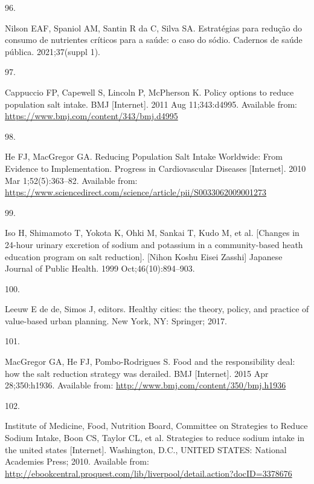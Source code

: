 \documentclass[
]{article}
\newlength{\cslhangindent}
\newlength{\csllabelwidth}
\newlength{\cslentryspacingunit} %
\newenvironment{CSLReferences}[2] %
 {%
  \setlength{\parindent}{0pt}
  \ifodd #1
  \let\oldpar\par
  \def\par{\hangindent=\cslhangindent\oldpar}
  \fi
  \setlength{\parskip}{#2\cslentryspacingunit}
 }%
 {}
\newcommand{\CSLLeftMargin}[1]{\parbox[t]{\csllabelwidth}{#1}}
\newcommand{\CSLRightInline}[1]{\parbox[t]{\linewidth - \csllabelwidth}{#1}\break}
\begin{document}
\begin{CSLReferences}{0}{0}
\leavevmode{}%
\CSLLeftMargin{96. }%
\CSLRightInline{Nilson EAF, Spaniol AM, Santin R da C, Silva SA.
Estratégias para redução do consumo de nutrientes críticos para a saúde:
o caso do sódio. Cadernos de saúde pública. 2021;37(suppl 1). }

\leavevmode{}%
\CSLLeftMargin{97. }%
\CSLRightInline{Cappuccio FP, Capewell S, Lincoln P, McPherson K. Policy
options to reduce population salt intake. BMJ {[}Internet{]}. 2011 Aug
11;343:d4995. Available from:
\url{https://www.bmj.com/content/343/bmj.d4995}}

\leavevmode{}%
\CSLLeftMargin{98. }%
\CSLRightInline{He FJ, MacGregor GA. Reducing Population Salt Intake
Worldwide: From Evidence to Implementation. Progress in Cardiovascular
Diseases {[}Internet{]}. 2010 Mar 1;52(5):363--82. Available from:
\url{https://www.sciencedirect.com/science/article/pii/S0033062009001273}}

\leavevmode{}%
\CSLLeftMargin{99. }%
\CSLRightInline{Iso H, Shimamoto T, Yokota K, Ohki M, Sankai T, Kudo M,
et al. {[}Changes in 24-hour urinary excretion of sodium and potassium
in a community-based heath education program on salt reduction{]}.
{[}Nihon Koshu Eisei Zasshi{]} Japanese Journal of Public Health. 1999
Oct;46(10):894--903. }

\leavevmode{}%
\CSLLeftMargin{100. }%
\CSLRightInline{Leeuw E de de, Simos J, editors. Healthy cities: the
theory, policy, and practice of value-based urban planning. New York,
NY: Springer; 2017. }

\leavevmode{}%
\CSLLeftMargin{101. }%
\CSLRightInline{MacGregor GA, He FJ, Pombo-Rodrigues S. Food and the
responsibility deal: how the salt reduction strategy was derailed. BMJ
{[}Internet{]}. 2015 Apr 28;350:h1936. Available from:
\url{http://www.bmj.com/content/350/bmj.h1936}}

\leavevmode{}%
\CSLLeftMargin{102. }%
\CSLRightInline{Institute of Medicine, Food, Nutrition Board, Committee
on Strategies to Reduce Sodium Intake, Boon CS, Taylor CL, et al.
Strategies to reduce sodium intake in the united states {[}Internet{]}.
Washington, D.C., UNITED STATES: National Academies Press; 2010.
Available from:
\url{http://ebookcentral.proquest.com/lib/liverpool/detail.action?docID=3378676}}


\end{CSLReferences}
\end{document}
